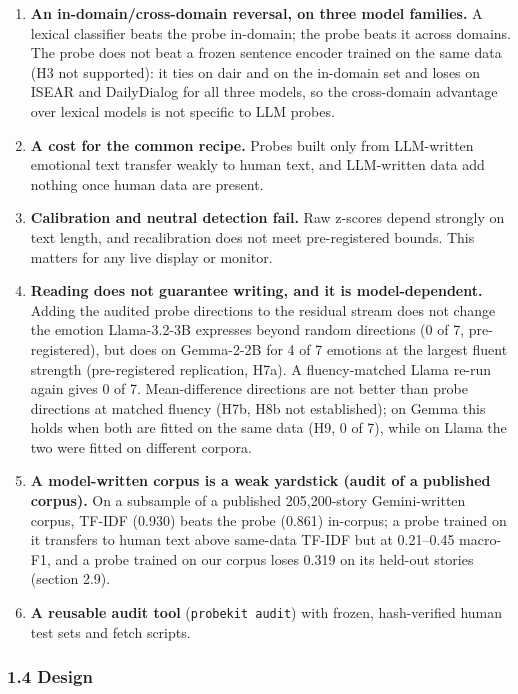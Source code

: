 \documentclass[
  10pt,
]{article}
\providecommand{\tightlist}{%
  \setlength{\itemsep}{0pt}\setlength{\parskip}{0pt}}
\begin{document}
\begin{enumerate}
\def\labelenumi{\arabic{enumi}.}
\tightlist
\item
  \textbf{An in-domain/cross-domain reversal, on three model families.}
  A lexical classifier beats the probe in-domain; the probe beats it
  across domains. The probe does not beat a frozen sentence encoder
  trained on the same data (H3 not supported): it ties on dair and on
  the in-domain set and loses on ISEAR and DailyDialog for all three
  models, so the cross-domain advantage over lexical models is not
  specific to LLM probes.
\item
  \textbf{A cost for the common recipe.} Probes built only from
  LLM-written emotional text transfer weakly to human text, and
  LLM-written data add nothing once human data are present.
\item
  \textbf{Calibration and neutral detection fail.} Raw z-scores depend
  strongly on text length, and recalibration does not meet
  pre-registered bounds. This matters for any live display or monitor.
\item
  \textbf{Reading does not guarantee writing, and it is
  model-dependent.} Adding the audited probe directions to the residual
  stream does not change the emotion Llama-3.2-3B expresses beyond
  random directions (0 of 7, pre-registered), but does on Gemma-2-2B for
  4 of 7 emotions at the largest fluent strength (pre-registered
  replication, H7a). A fluency-matched Llama re-run again gives 0 of 7.
  Mean-difference directions are not better than probe directions at
  matched fluency (H7b, H8b not established); on Gemma this holds when
  both are fitted on the same data (H9, 0 of 7), while on Llama the two
  were fitted on different corpora.
\item
  \textbf{A model-written corpus is a weak yardstick (audit of a
  published corpus).} On a subsample of a published 205,200-story
  Gemini-written corpus, TF-IDF (0.930) beats the probe (0.861)
  in-corpus; a probe trained on it transfers to human text above
  same-data TF-IDF but at 0.21--0.45 macro-F1, and a probe trained on
  our corpus loses 0.319 on its held-out stories (section 2.9).
\item
  \textbf{A reusable audit tool} (\texttt{probekit\ audit}) with frozen,
  hash-verified human test sets and fetch scripts.
\end{enumerate}

\subsubsection{1.4 Design}\label{14-design}
\end{document}
